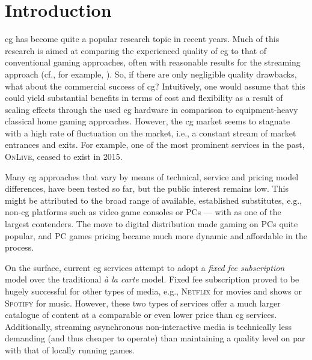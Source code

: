 
\section{Introduction}

\Gls{cg} has become quite a popular research topic in recent years.
Much of this research is aimed at comparing the experienced quality of
\gls{cg} to that of conventional gaming approaches, often with
reasonable results for the streaming approach (cf., for example,
\cite{5976180}). So, if there are only negligible quality drawbacks,
what about the commercial success of \gls{cg}? Intuitively, one
would assume that this could yield substantial benefits in terms of cost
and flexibility as a result of scaling effects through the used
\gls{cg} hardware in comparison to equipment-heavy classical home gaming
approaches. However, the \gls{cg} market seems to stagnate with a
high rate of fluctuation on the market, i.e., a constant stream of
market entrances and exits. For example, one of the most prominent
services in the past, \textsc{OnLive}, ceased to exist in 2015.




Many \gls{cg} approaches that vary by means of technical, service
and pricing model differences, have been tested so far, but the public
interest remains low. This might be attributed to the broad range of
available, established substitutes, e.g., non-\gls{cg} platforms
such as video game consoles or PCs ---
with \steam{} as one of the
largest contenders. The move to digital distribution made gaming on PCs
quite popular, and PC games pricing became much more dynamic and
affordable in the process.

On the surface, current \gls{cg} services attempt to adopt a
\textit{fixed fee subscription} model over the traditional \textit{à la
carte} model. Fixed fee subscription proved to be hugely successful for
other types of media, e.g., \textsc{Netflix} for movies and shows or
\textsc{Spotify} for music. However, these two types of services offer a
much larger catalogue of content at a comparable or even lower price
than \gls{cg} services. Additionally, streaming asynchronous
non-interactive media is technically less demanding (and thus cheaper to
operate) than maintaining a quality level on par with that of locally
running games.

